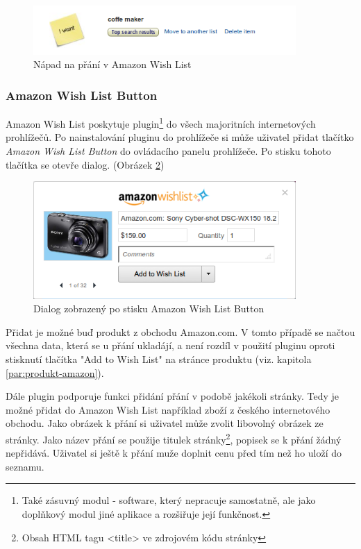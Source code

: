 \begin{figure}[htb]
\begin{center}
\includegraphics[width=100mm]{./pictures/amazon-wishlist-idea.png}
\caption{Nápad na přání v Amazon Wish List}
\label{fig:amazon-wishlist-idea}
\end{center}
\end{figure}

\subsubsection{Amazon Wish List Button}
\label{sec:amazon-wishlist-button}
Amazon Wish List poskytuje plugin\footnote{Také zásuvný modul - software, který nepracuje samostatně, ale jako doplňkový modul jiné aplikace a rozšiřuje její funkčnost.} do všech majoritních internetových prohlížečů\cite{website:amazon:plugin}. Po nainstalování pluginu do prohlížeče si může uživatel přidat tlačítko \emph{Amazon Wish List Button} do ovládacího panelu prohlížeče. Po stisku tohoto tlačítka se otevře dialog. (Obrázek \ref{fig:amazon-wishlist-plugin})

\begin{figure}[htb]
\begin{center}
\includegraphics[width=100mm]{./pictures/amazon-wishlist-plugin.png}
\caption{Dialog zobrazený po stisku Amazon Wish List Button}
\label{fig:amazon-wishlist-plugin}
\end{center}
\end{figure}

Přidat je možné buď produkt z obchodu Amazon.com. V tomto případě se načtou všechna data, která se u přání ukladájí, a není rozdíl v použití pluginu oproti stisknutí tlačítka "Add to Wish List" na stránce produktu (viz. kapitola \ref{par:produkt-amazon}).

Dále plugin podporuje funkci přidání přání v podobě jakékoli stránky. Tedy je možné přidat do Amazon Wish List například zboží z českého internetového obchodu. Jako obrázek k přání si uživatel může zvolit libovolný obrázek ze stránky. Jako název přání se použije titulek stránky\footnote{Obsah HTML tagu <title> ve zdrojovém kódu stránky}, popisek se k přání žádný nepřidává. Uživatel si ještě k přání muže doplnit cenu před tím než ho uloží do seznamu.

